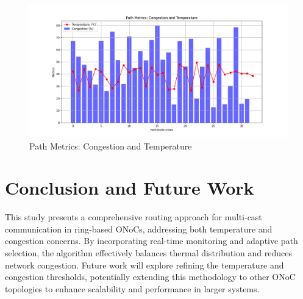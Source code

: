 \documentclass[conference]{IEEEtran}
\begin{document}
\begin{figure}[h]
    \centering
    \includegraphics[width=\linewidth]{path_metrics.png}
    \caption{Path Metrics: Congestion and Temperature}
    \label{fig:path_metrics}
\end{figure}

\section{Conclusion and Future Work}
This study presents a comprehensive routing approach for multi-cast communication in ring-based ONoCs, addressing both temperature and congestion concerns. By incorporating real-time monitoring and adaptive path selection, the algorithm effectively balances thermal distribution and reduces network congestion. Future work will explore refining the temperature and congestion thresholds, potentially extending this methodology to other ONoC topologies to enhance scalability and performance in larger systems.



\end{document}
